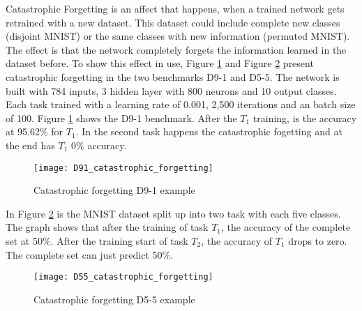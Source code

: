 Catastrophic Forgetting is an affect that happens, when a trained network gets retrained with a new dataset.
This dataset could include complete new classes (disjoint MNIST) or the same classes with new information (permuted MNIST).
The effect is that the network completely forgets the information learned in the dataset before.
\newline
To show this effect in use, Figure \ref{fig:catastrophic_forgetting_d91_example} and Figure \ref{fig:catastrophic_forgetting_d55_example} present catastrophic forgetting in the two benchmarks D9-1 and D5-5.
\newline
The network is built with 784 inputs, 3 hidden layer with 800 neurons and 10 output classes.
Each task trained with a learning rate of 0.001, 2,500 iterations and an batch size of 100.
\newline
Figure \ref{fig:catastrophic_forgetting_d91_example} shows the D9-1 benchmark. After the $T_1$ training, is the accuracy at 95.62\% for $T_1$. In the second task happens the catastrophic fogetting and at the end has $T_1$ 0\% accuracy.

\begin{figure}[H]
    \centering
    \texttt{[image: D91\_catastrophic\_forgetting]}
    \caption{Catastrophic forgetting D9-1 example}
    \label{fig:catastrophic_forgetting_d91_example}
\end{figure}

\newpage

In Figure \ref{fig:catastrophic_forgetting_d55_example} is the MNIST dataset split up into two task with each five classes.
The graph shows that after the training of task $T_1$, the accuracy of the complete set at 50\%.
After the training start of task $T_2$, the accuracy of $T_1$ drops to zero.
The complete set can just predict 50\%.

\begin{figure}[H]
    \centering
    \texttt{[image: D55\_catastrophic\_forgetting]}
    \caption{Catastrophic forgetting D5-5 example}
    \label{fig:catastrophic_forgetting_d55_example}
\end{figure}

